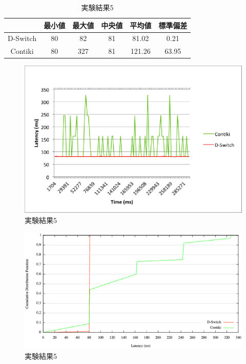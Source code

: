 \begin{table}[htb]
  \centering
  \caption{実験結果5}
  \begin{tabular}{|c||c|c|c|c|c|} \hline
    \backslashbox{}{} & 最小値 & 最大値 & 中央値 & 平均値 & 標準偏差 \\ \hline \hline
    D-Switch & 80 & 82 & 81 & 81.02 & 0.21 \\ \hline
    Contiki & 80 & 327 & 81 & 121.26 & 63.95 \\ \hline
  \end{tabular}
  \label{tab:latency5}
\end{table}

\begin{figure}[htbp]
 \begin{center}
  \includegraphics[width=120mm]{./images/latency5.eps}
 \end{center}
 \caption{実験結果5}
 \label{fig:latency5}
\end{figure}

\begin{figure}[htbp]
 \begin{center}
  \includegraphics[width=120mm]{./images/cdf5.eps}
 \end{center}
 \caption{実験結果5}
 \label{fig:cdf5}
\end{figure}





